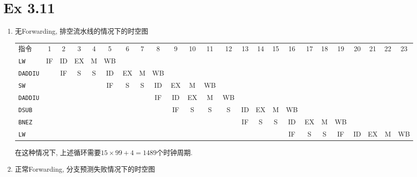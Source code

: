 \newcommand{\doctitle}{计算机系统结构第三次作业}


\section{Ex 3.11}

\begin{solve}
  \begin{enumerate}
  \item 无Forwarding, 排空流水线的情况下的时空图

    \begin{flushleft}
      \footnotesize
      \begin{tabular}{@{~}lc@{~}c@{~}c@{~}c@{~}c@{~}c@{~}c@{~}c@{~}c@{~}c@{~}c@{~}c@{~}c@{~}c@{~}c@{~}c@{~}c@{~}c@{~}c@{~}c@{~}c@{~}c@{~}c@{~}}
        指令
        & 1  & 2  & 3  & 4  & 5  & 6  & 7  & 8  & 9  & 10 & 11 & 12 & 13 & 14 & 15 & 16 & 17 & 18 & 19 & 20 & 21 & 22 & 23 \\
        \texttt{LW}     & IF & ID & EX & M  & WB \\
        \texttt{DADDIU} &    & IF & S  & S  & ID & EX & M  & WB \\
        \texttt{SW}     &    &    &    &    & IF & S  & S  & ID & EX & M  & WB \\
        \texttt{DADDIU} &    &    &    &    &    &    &    & IF & ID & EX & M  & WB \\
        \texttt{DSUB}   &    &    &    &    &    &    &    &    & IF & S  & S  & S  & ID & EX & M  & WB \\
        \texttt{BNEZ}   &    &    &    &    &    &    &    &    &    &    &    &    & IF & S  & S  & ID & EX & M  & WB \\
        \texttt{LW}     &    &    &    &    &    &    &    &    &    &    &    &    &    &    &    & IF & S  & S  & IF & ID & EX & M  & WB \\
      \end{tabular}
    \end{flushleft}

    在这种情况下, 上述循环需要$15\times{}99 + 4 = 1489$个时钟周期.

    
  \item 正常Forwarding, 分支预测失败情况下的时空图


\end{enumerate}
\end{solve}
